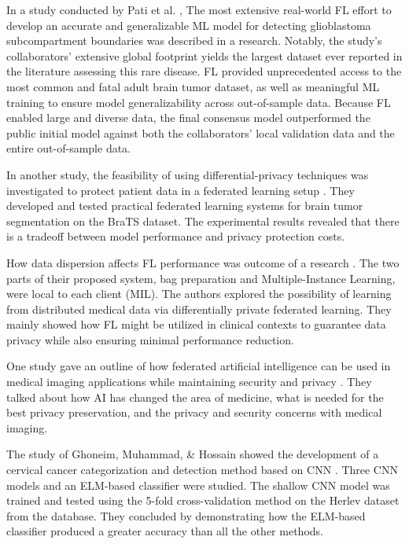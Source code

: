 In a study conducted by Pati et al. \cite{ar8}, The most extensive real-world FL effort to develop an accurate and generalizable ML model for detecting glioblastoma subcompartment boundaries was described in a research. Notably, the study’s collaborators’ extensive global footprint yields the largest dataset ever reported in the literature assessing this rare disease. FL provided unprecedented access to the most common and fatal adult brain tumor dataset, as well as meaningful ML training to ensure model generalizability across out-of-sample data. Because FL enabled large and diverse data, the final consensus model outperformed the public initial model against both the collaborators’ local validation data and the entire out-of-sample data.

In another study, the feasibility of using differential-privacy techniques was investigated to protect patient data in a federated learning setup \cite{ar9}. They developed and tested practical federated learning systems for brain tumor segmentation on the BraTS dataset. The experimental results revealed that there is a tradeoff between model performance and privacy protection costs. 

How data dispersion affects FL performance was outcome of a research \cite{ar10}. The two parts of their proposed system, bag preparation and Multiple-Instance Learning, were local to each client (MIL). The authors explored the possibility of learning from distributed medical data via differentially private federated learning. They mainly showed how FL might be utilized in clinical contexts to guarantee data privacy while also ensuring minimal performance reduction. 

One study gave an outline of how federated artificial intelligence can be used in medical imaging applications while maintaining security and privacy \cite{ar11}. They talked about how AI has changed the area of medicine, what is needed for the best privacy preservation, and the privacy and security concerns with medical imaging. 

The study of Ghoneim, Muhammad, \& Hossain showed the development of a cervical cancer categorization and detection method based on CNN \cite{ar12}. Three CNN models and an ELM-based classifier were studied. The shallow CNN model was trained and tested using the 5-fold cross-validation method on the Herlev dataset from the database. They concluded by demonstrating how the ELM-based classifier produced a greater accuracy than all the other methods. 

